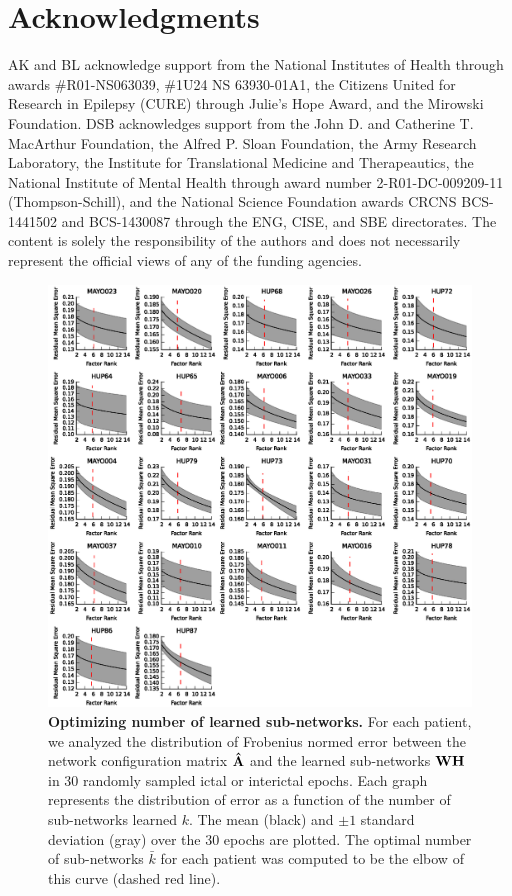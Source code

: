 \section{Acknowledgments}
AK and BL acknowledge support from the National Institutes of Health through awards \#R01-NS063039, \#1U24 NS 63930-01A1, the Citizens United for Research in Epilepsy (CURE) through Julie's Hope Award, and the Mirowski Foundation. DSB acknowledges support from the John D. and Catherine T. MacArthur Foundation, the Alfred P. Sloan Foundation, the Army Research Laboratory, the Institute for Translational Medicine and Therapeautics, the National Institute of Mental Health through award number 2-R01-DC-009209-11 (Thompson-Schill), and the National Science Foundation awards CRCNS BCS-1441502 and BCS-1430087 through the ENG, CISE, and SBE directorates. The content is solely the responsibility of the authors and does not necessarily represent the official views of any of the funding agencies.

\begin{figure}[H]
    \centering
    \includegraphics[width=\textwidth]{NMF_factor_optimization.eps}
    \caption[Optimizing number of learned sub-networks]{\textbf{Optimizing number of learned sub-networks.} For each patient, we analyzed the distribution of Frobenius normed error between the network configuration matrix $\mathbf{\displaystyle \hat A}$ and the learned sub-networks $\mathbf{\displaystyle W}\mathbf{\displaystyle H}$ in 30 randomly sampled ictal or interictal epochs. Each graph represents the distribution of error as a function of the number of sub-networks learned $k$. The mean (black) and $\pm1$ standard deviation (gray) over the 30 epochs are plotted. The optimal number of sub-networks $\bar{k}$ for each patient was computed to be the elbow of this curve (dashed red line). \label{ch4:figS1}}    
\end{figure}

